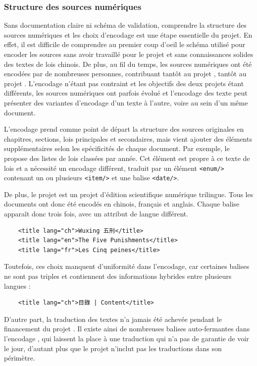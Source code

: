 \subsubsection{Structure des sources numériques}
Sans documentation claire ni schéma de validation, comprendre la structure des sources numériques et les choix d'encodage est une étape essentielle du projet. En effet, il est difficile de comprendre au premier coup d'oeil le schéma utilisé pour encoder les sources sans avoir travaillé pour le projet \LSC et sans connaissances solides des textes de lois chinois. De plus, au fil du temps, les sources numériques ont été encodées par de nombreuses personnes, contribuant tantôt au projet \LSC, tantôt au projet \COREL. L'encodage n'étant pas contraint et les objectifs des deux projets étant différents, les sources numériques ont parfois évolué et l'encodage des texte peut présenter des variantes d'encodage d'un texte à l'autre, voire au sein d'un même document. 

L'encodage \LSC prend comme point de départ la structure des sources originales en chapitres, sections, lois principales et secondaires, mais vient ajouter des éléments supplémentaires selon les spécificités de chaque document. Par exemple, le \huidian propose des listes de lois classées par année. Cet élément est propre à ce texte de lois et a nécessité un encodage différent, traduit par un élément \texttt{<enum/>} contenant un ou plusieurs \texttt{<item/>} et une balise \texttt{<date/>}.

De plus, le projet \LSC est un projet d'édition scientifique numérique trilingue. Tous les documents ont donc été encodés en chinois, français et anglais. Chaque balise apparaît donc trois fois, avec un attribut de langue différent. 
\begin{verbatim}
    <title lang="ch">Wuxing 五刑</title>
    <title lang="en">The Five Punishments</title>
    <title lang="fr">Les Cinq peines</title>
\end{verbatim}
Toutefois, ces choix manquent d'uniformité dans l'encodage, car certaines balises ne sont pas triples et contiennent des informations hybrides entre plusieurs langues :
\begin{verbatim}
    <title lang="ch">目錄 | Content</title>
\end{verbatim}
D'autre part, la traduction des textes n'a jamais été achevée pendant le financement du projet \LSC. Il existe ainsi de nombreuses balises auto-fermantes dans l'encodage \XML, qui laissent la place à une traduction qui n'a pas de garantie de voir le jour, d'autant plus que le projet \COREL n'inclut pas les traductions dans son périmètre. 

